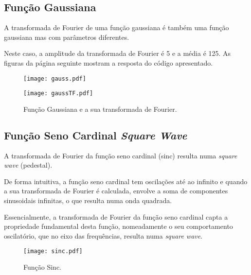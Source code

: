 \subsection{Função Gaussiana}

A transformada de Fourier de uma função gaussiana é também uma função gaussiana mas com parâmetros diferentes.



Neste caso, a amplitude da transformada de Fourier é 5 e a média é 125. As figuras da página seguinte mostram a resposta do código apresentado.

\newpage

\begin{figure}[!ht]
    \centering
    \begin{minipage}[b]{0.49\textwidth}
        \centering
        \texttt{[image: gauss.pdf]}
    \end{minipage}
    \hfill
    \begin{minipage}[b]{0.49\textwidth}
        \centering
        \texttt{[image: gaussTF.pdf]}
    \end{minipage}
    \caption{Função Gaussiana e a sua transformada de Fourier.}
\end{figure}

\subsection{Função Seno Cardinal \boldmath{$\rightarrow$} \emph{Square Wave}}



A transformada de Fourier da função seno cardinal (sinc) resulta numa \emph{square wave} (pedestal). 

De forma intuitiva, a função seno cardinal tem oscilações até ao infinito e quando a sua transformada de Fourier é calculada, envolve a soma de componentes sinusoidais infinitas, o que resulta numa onda quadrada. 

Essencialmente, a transformada de Fourier da função seno cardinal capta a propriedade fundamental desta função, nomeadamente o seu comportamento oscilatório, que no eixo das frequências, resulta numa \emph{square wave}.

\begin{figure}[!ht]
\centering
\texttt{[image: sinc.pdf]}
\caption{Função Sinc.}
\end{figure}

